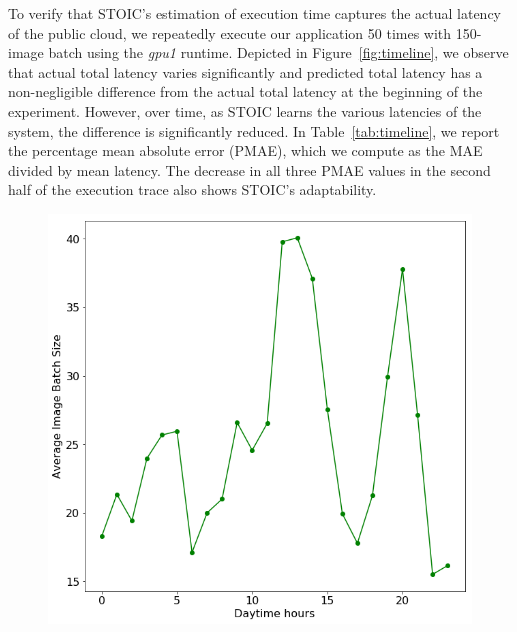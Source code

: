 To verify that STOIC's estimation of execution time captures the actual
latency of the public cloud, we repeatedly execute our application 50 times
with 150-image batch using the \textit{gpu1} runtime. Depicted in
Figure~\ref{fig:timeline}, we observe that actual total latency varies
significantly and predicted total latency has a non-negligible difference from
the actual total latency at the beginning of the experiment. However, over
time, as STOIC learns the various latencies of the system, the difference is
significantly reduced. In Table~\ref{tab:timeline}, we report the percentage
mean absolute error (PMAE), which we compute as the MAE divided by mean
latency. The decrease in all three PMAE values in the second half of the
execution trace also shows STOIC's adaptability.

\begin{figure}
\centering
\begin{minipage}{.50\textwidth}
  \centering
  \includegraphics[width=\linewidth]{figures/Hourly_act.png}
  \label{fig:hour_act}
\end{minipage}%
\begin{minipage}{.50\textwidth}
  \centering

\end{minipage}
\end{figure}
